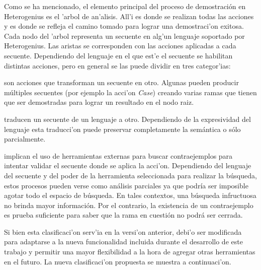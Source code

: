 Como se ha mencionado, el elemento principal del proceso de demostración en Heterogenius es el 'arbol de an'alisis. All'i es donde se realizan todas las acciones y es donde se refleja el camino tomado para lograr una demostraci'on exitosa. Cada nodo del 'arbol representa un secuente en alg'un lenguaje soportado por Heterogenius. Las aristas se corresponden con las acciones aplicadas a cada secuente. Dependiendo del lenguaje en el que est'e el secuente se habilitan distintas acciones, pero en general se las puede dividir en tres categor'ias:

\begin{description}
\label{clasificacion}
\item[\textbf{reglas del c'alculo de secuentes}:] son acciones que transforman un secuente en otro. Algunas pueden producir múltiples secuentes (por ejemplo la acci'on \emph{Case}) creando varias ramas que tienen que ser demostradas para lograr un resultado en el nodo raiz.

\item[\textbf{traducciones}:] traducen un secuente de un lenguaje a otro. Dependiendo de la expresividad del lenguaje esta traducci'on puede preservar completamente la semántica o sólo parcialmente.

\item[\textbf{búsquedas de contraejemplos}:] implican el uso de herramientas externas para buscar contraejemplos para intentar validar el secuente donde se aplica la acci'on. 
Dependiendo del lenguaje del secuente y del poder de la herramienta seleccionada para realizar la búsqueda, estos procesos pueden verse como análisis parciales ya que podría ser imposible agotar todo el espacio de búsqueda. En tales contextos, una búsqueda infructuosa no brinda mayor información. Por el contrario, la existencia de un contraejemplo es prueba suficiente para saber que la rama en cuestión no podrá ser cerrada.
\end{description}

Si bien esta clasificaci'on serv'ia en la versi'on anterior, debi'o ser modificada para adaptarse a la nueva funcionalidad incluida durante el desarrollo de este trabajo y permitir una mayor flexibilidad a la hora de agregar otras herramientas en el futuro.
La nueva clasificaci'on propuesta se muestra a continuaci'on.

